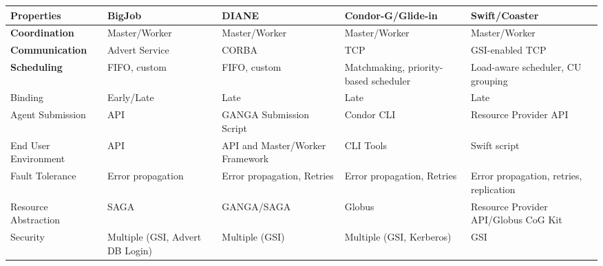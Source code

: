 \documentclass[conference,final]{IEEEtran}
\newcommand{\cu}{CU\xspace}
\begin{document}
\begin{table}[t]
\centering
\begin{tabular}{|l|p{2.5cm}|p{2.5cm}|p{2.5cm}|p{2.5cm}|}
	\hline
	\textbf{Properties}
	&\textbf{BigJob} &\textbf{DIANE} &\textbf{Condor-G/Glide-in} &   
	\textbf{Swift/Coaster} \\ \hline

\textbf{Coordination} &Master/Worker  &Master/Worker  &Master/Worker &Master/Worker \\ \hline
	
\textbf{Communication} &Advert Service &CORBA &TCP &GSI-enabled TCP \\ \hline

\textbf{Scheduling} &FIFO, custom &FIFO, custom &Matchmaking, priority-based scheduler 
&Load-aware scheduler, \cu  grouping\\

\hfill Binding &\hfill Early/Late &\hfill Late &\hfill Late &\hfill Late\\


\hline
Agent Submission &API &GANGA Submission Script &Condor CLI 
&Resource Provider API\\

\hline

End User Environment &API &API and Master/Worker Framework &CLI Tools &Swift 
script\\ 

\hline

Fault Tolerance &Error propagation &Error propagation, Retries &Error propagation, Retries &Error propagation, retries, replication\\

\hline

Resource Abstraction &SAGA &GANGA/SAGA &Globus &Resource Provider API/Globus CoG 
Kit \\ 

\hline

Security &Multiple (GSI, Advert DB Login) &Multiple (GSI) &Multiple (GSI, 
Kerberos) &GSI\\ 

\hline



\end{tabular}
\end{table}
\end{document}
